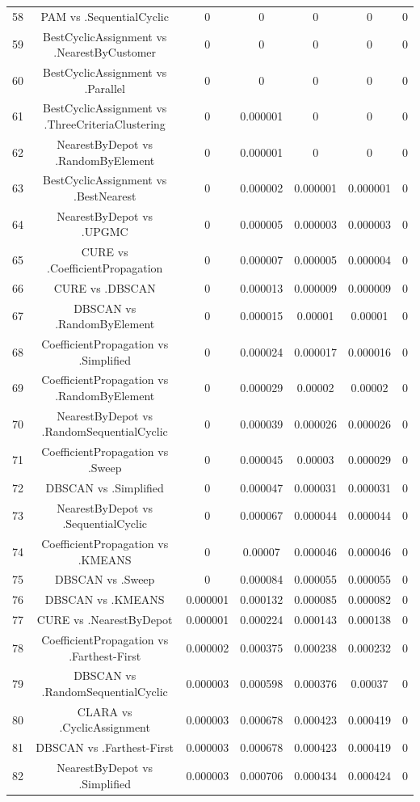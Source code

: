\documentclass[a4paper,10pt]{article}
\begin{document}
\begin{landscape}
\begin{table}[!htp]
\begin{tabular}{ccccccc}
58&PAM vs .SequentialCyclic&0&0&0&0&0\\
59&BestCyclicAssignment vs .NearestByCustomer&0&0&0&0&0\\
60&BestCyclicAssignment vs .Parallel&0&0&0&0&0\\
61&BestCyclicAssignment vs .ThreeCriteriaClustering&0&0.000001&0&0&0\\
62&NearestByDepot vs .RandomByElement&0&0.000001&0&0&0\\
63&BestCyclicAssignment vs .BestNearest&0&0.000002&0.000001&0.000001&0\\
64&NearestByDepot vs .UPGMC&0&0.000005&0.000003&0.000003&0\\
65&CURE vs .CoefficientPropagation&0&0.000007&0.000005&0.000004&0\\
66&CURE vs .DBSCAN&0&0.000013&0.000009&0.000009&0\\
67&DBSCAN vs .RandomByElement&0&0.000015&0.00001&0.00001&0\\
68&CoefficientPropagation vs .Simplified&0&0.000024&0.000017&0.000016&0\\
69&CoefficientPropagation vs .RandomByElement&0&0.000029&0.00002&0.00002&0\\
70&NearestByDepot vs .RandomSequentialCyclic&0&0.000039&0.000026&0.000026&0\\
71&CoefficientPropagation vs .Sweep&0&0.000045&0.00003&0.000029&0\\
72&DBSCAN vs .Simplified&0&0.000047&0.000031&0.000031&0\\
73&NearestByDepot vs .SequentialCyclic&0&0.000067&0.000044&0.000044&0\\
74&CoefficientPropagation vs .KMEANS&0&0.00007&0.000046&0.000046&0\\
75&DBSCAN vs .Sweep&0&0.000084&0.000055&0.000055&0\\
76&DBSCAN vs .KMEANS&0.000001&0.000132&0.000085&0.000082&0\\
77&CURE vs .NearestByDepot&0.000001&0.000224&0.000143&0.000138&0\\
78&CoefficientPropagation vs .Farthest-First&0.000002&0.000375&0.000238&0.000232&0\\
79&DBSCAN vs .RandomSequentialCyclic&0.000003&0.000598&0.000376&0.00037&0\\
80&CLARA vs .CyclicAssignment&0.000003&0.000678&0.000423&0.000419&0\\
81&DBSCAN vs .Farthest-First&0.000003&0.000678&0.000423&0.000419&0\\
82&NearestByDepot vs .Simplified&0.000003&0.000706&0.000434&0.000424&0\\

\end{tabular}
\end{table}
\end{landscape}
\end{document}
